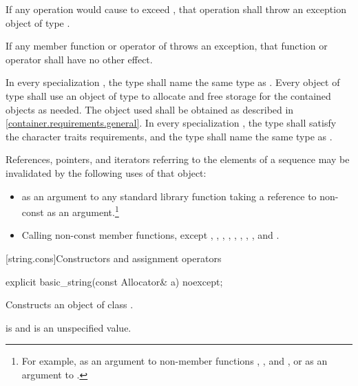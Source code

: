 \pnum
If any operation would cause  to
exceed , that operation shall throw an
exception object of type .

\pnum
If any member function or operator of  throws an exception, that
function or operator shall have no other effect.

\pnum
In every specialization ,
the type  shall name the same type
as . Every object of type
 shall use an object of type
 to allocate and free storage for the contained 
objects as needed. The  object used shall be
obtained as described in \ref{container.requirements.general}.
In every specialization ,
the type  shall satisfy
the character traits requirements, and
the type  shall name the same type as .

\pnum
References, pointers, and iterators referring to the elements of a
 sequence may be
invalidated by the following uses of that  object:

\begin{itemize}
\item as an argument to any standard library function taking a reference to non-const
 as an argument.\footnote{For example, as an argument to non-member
functions ,
, and , or as
an argument to .}

\item Calling non-const member functions, except
,
,
,
,
,
,
,
,
and
.
\end{itemize}

[string.cons]{Constructors and assignment operators}

%
\begin{itemdecl}
explicit basic_string(const Allocator& a) noexcept;
\end{itemdecl}

\begin{itemdescr}
\pnum
\effects
Constructs an object of class .

\pnum
\postconditions
{} is  and  is an unspecified value.
\end{itemdescr}

